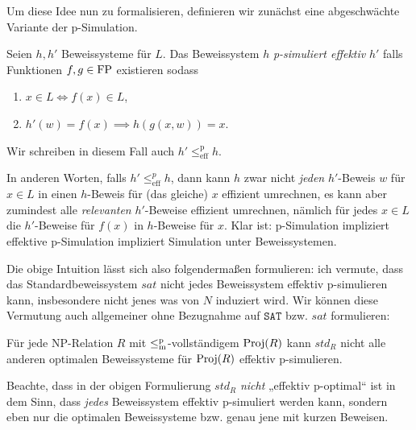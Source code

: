Um diese Idee nun zu formalisieren, definieren wir zunächst eine abgeschwächte Variante der p-Simulation.
\begin{definition}
    Seien $h,h'$ Beweissysteme für $L$. Das Beweissystem $h$ \emph{p-simuliert effektiv} $h'$ falls Funktionen $f,g\in\mathrm{FP}$ existieren sodass
    \begin{enumerate}
        \item $x\in L \iff f(x)\in L$,
        \item $ h'(w)=f(x) \implies h(g(x, w)) = x. $
    \end{enumerate}
    Wir schreiben in diesem Fall auch $h'\leq^\mathrm p_\mathrm{eff} h$. %
\end{definition}
In anderen Worten, falls $h'\leq^p_\mathrm{eff} h$, dann kann $h$ zwar nicht \emph{jeden} $h'$-Beweis $w$ für $x\in L$ in einen $h$-Beweis für (das gleiche) $x$ effizient umrechnen, es kann aber zumindest alle \emph{relevanten} $h'$-Beweise effizient umrechnen, nämlich für jedes $x\in L$ die $h'$-Beweise für $f(x)$ in $h$-Beweise für $x$.
Klar ist: p-Simulation impliziert effektive p-Simulation impliziert Simulation unter Beweissystemen.

Die obige Intuition lässt sich also folgendermaßen formulieren: ich vermute, dass das Standardbeweissystem $\mathit{sat}$ nicht jedes Beweissystem effektiv p-simulieren kann, insbesondere nicht jenes was von $N$ induziert wird.
Wir können diese Vermutung auch allgemeiner ohne Bezugnahme auf $\mathtt{SAT}$ bzw. $\mathit{sat}$ formulieren:

\begin{conjecture}\label{conj:kvl-ps}
    Für jede NP-Relation $R$ mit $\leq_\mathrm{m}^\mathrm{p}$-vollständigem $\operatorname{Proj}(R)$ kann $\mathit{std}_R$ nicht alle anderen optimalen Beweissysteme für $\operatorname{Proj}(R)$ effektiv p-simulieren.


\end{conjecture}
Beachte, dass in der obigen Formulierung $\mathit{std}_R$ \emph{nicht} „effektiv p-optimal“ ist in dem Sinn, dass \emph{jedes} Beweissystem effektiv p-simuliert werden kann, sondern eben nur die optimalen Beweissysteme bzw. genau jene mit kurzen Beweisen.

